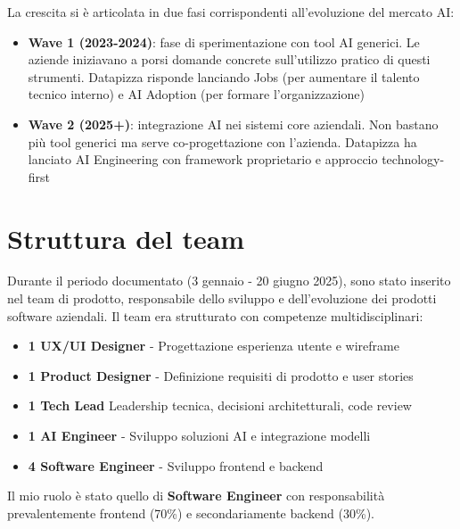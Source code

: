 La crescita si è articolata in due fasi corrispondenti all'evoluzione del mercato AI:
\begin{itemize}
  \item \textbf{Wave 1 (2023-2024)}: fase di sperimentazione con tool 
        AI generici. Le aziende iniziavano a porsi domande concrete 
        sull'utilizzo pratico di questi strumenti. Datapizza risponde 
        lanciando Jobs (per aumentare il talento tecnico interno) e AI 
        Adoption (per formare l'organizzazione)
  
  \item \textbf{Wave 2 (2025+)}: integrazione AI nei sistemi core 
        aziendali. Non bastano più tool generici ma serve co-progettazione 
        con l'azienda. Datapizza ha lanciato AI Engineering con framework 
        proprietario e approccio technology-first
\end{itemize}

\section{Struttura del team}
Durante il periodo documentato (3 gennaio - 20 giugno 2025), sono stato inserito nel team di prodotto, responsabile dello sviluppo e dell'evoluzione dei prodotti software aziendali. Il team era strutturato con competenze multidisciplinari:

\begin{itemize}
  \item \textbf{1 UX/UI Designer} - Progettazione esperienza utente e wireframe
  \item \textbf{1 Product Designer} - Definizione requisiti di prodotto e user stories
  \item \textbf{1 Tech Lead} Leadership tecnica, decisioni architetturali, code review
  \item \textbf{1 AI Engineer} - Sviluppo soluzioni AI e integrazione modelli
  \item \textbf{4 Software Engineer} - Sviluppo frontend e backend
\end{itemize}

Il mio ruolo è stato quello di \textbf{Software Engineer} con responsabilità prevalentemente frontend (70\%) e secondariamente backend (30\%).
